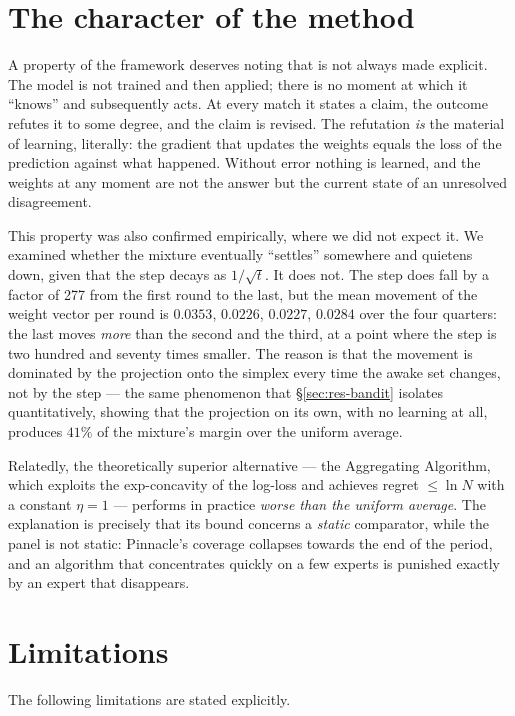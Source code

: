 \documentclass[12pt,a4paper,oneside]{report}
\renewcommand{\_}{\oldunderscore\allowbreak}
\theoremstyle{definition}
\theoremstyle{plain}
\theoremstyle{remark}
\begin{document}
\section{The character of the method}

A property of the framework deserves noting that is not always made explicit. The model is not
trained and then applied; there is no moment at which it ``knows'' and subsequently acts. At every
match it states a claim, the outcome refutes it to some degree, and the claim is revised. The
refutation \emph{is} the material of learning, literally: the gradient that updates the weights
equals the loss of the prediction against what happened. Without error nothing is learned, and the
weights at any moment are not the answer but the current state of an unresolved disagreement.

This property was also confirmed empirically, where we did not expect it. We examined whether the
mixture eventually ``settles'' somewhere and quietens down, given that the step decays as
$1/\sqrt{t}$. It does not. The step does fall by a factor of 277 from the first round to the last,
but the mean movement of the weight vector per round is $0.0353$, $0.0226$, $0.0227$, $0.0284$
over the four quarters: the last moves \emph{more} than the second and the third, at a point where
the step is two hundred and seventy times smaller. The reason is that the movement is dominated by
the projection onto the simplex every time the awake set changes, not by the step --- the same
phenomenon that \S\ref{sec:res-bandit} isolates quantitatively, showing that the projection on its
own, with no learning at all, produces $41\%$ of the mixture's margin over the uniform average.

Relatedly, the theoretically superior alternative --- the Aggregating Algorithm, which exploits
the exp-concavity of the log-loss and achieves regret $\leq \ln N$ with a constant $\eta=1$ ---
performs in practice \emph{worse than the uniform average}. The explanation is precisely that its
bound concerns a \emph{static} comparator, while the panel is not static: Pinnacle's coverage
collapses towards the end of the period, and an algorithm that concentrates quickly on a few
experts is punished exactly by an expert that disappears.

\section{Limitations}
\label{sec:limits}

The following limitations are stated explicitly.
\end{document}
